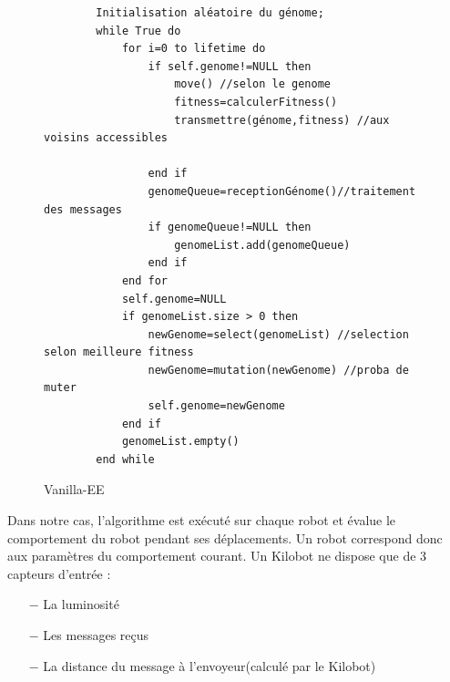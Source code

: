 \documentclass[a4paper]{article}
\begin{document}
\begin{figure}[h!]
	\centering
	\begin{lstlisting}
		Initialisation aléatoire du génome;
		while True do
			for i=0 to lifetime do
				if self.genome!=NULL then
					move() //selon le genome
					fitness=calculerFitness()
					transmettre(génome,fitness) //aux voisins accessibles
	
				end if
				genomeQueue=receptionGénome()//traitement des messages
				if genomeQueue!=NULL then
					genomeList.add(genomeQueue)
				end if
			end for
			self.genome=NULL
			if genomeList.size > 0 then
				newGenome=select(genomeList) //selection selon meilleure fitness	
				newGenome=mutation(newGenome) //proba de muter
				self.genome=newGenome
			end if
			genomeList.empty()
		end while
	\end{lstlisting}
	\caption{Vanilla-EE}
\end{figure}
Dans notre cas, l'algorithme est exécuté sur chaque robot et évalue le comportement du robot pendant ses déplacements. Un robot correspond donc aux paramètres du comportement courant.
Un Kilobot ne dispose que de 3 capteurs d'entrée :
\begin{itemize}
	\item[$-$] La luminosité
	\item [$-$]Les messages reçus
	\item [$-$]La distance du message à l'envoyeur(calculé par le Kilobot)\\
\end{itemize}
\end{document}
